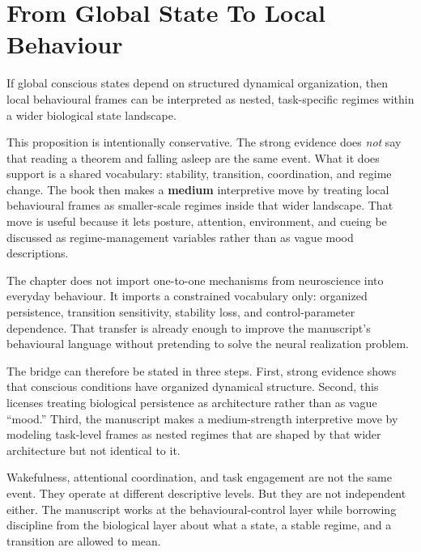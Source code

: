 \section{From Global State To Local Behaviour}

\begin{proposition}
If global conscious states depend on structured dynamical organization, then
local behavioural frames can be interpreted as nested, task-specific regimes
within a wider biological state landscape.
\end{proposition}

\begin{discussion}
This proposition is intentionally conservative. The strong evidence does
\emph{not} say that reading a theorem and falling asleep are the same event.
What it does support is a shared vocabulary: stability, transition,
coordination, and regime change. The book then makes a \textbf{medium}
interpretive move by treating local behavioural frames as smaller-scale regimes
inside that wider landscape. That move is useful because it lets posture,
attention, environment, and cueing be discussed as regime-management variables
rather than as vague mood descriptions.
\end{discussion}

\begin{remark}
The chapter does not import one-to-one mechanisms from neuroscience into
everyday behaviour. It imports a constrained vocabulary only: organized
persistence, transition sensitivity, stability loss, and control-parameter
dependence. That transfer is already enough to improve the manuscript's
behavioural language without pretending to solve the neural realization
problem.
\end{remark}

\begin{discussion}
The bridge can therefore be stated in three steps. First, strong evidence shows
that conscious conditions have organized dynamical structure. Second, this
licenses treating biological persistence as architecture rather than as vague
``mood.'' Third, the manuscript makes a medium-strength interpretive move by
modeling task-level frames as nested regimes that are shaped by that wider
architecture but not identical to it.
\end{discussion}

\begin{remark}
Wakefulness, attentional coordination, and task engagement are not the same
event. They operate at different descriptive levels. But they are not
independent either. The manuscript works at the behavioural-control layer while
borrowing discipline from the biological layer about what a state, a stable
regime, and a transition are allowed to mean.
\end{remark}

